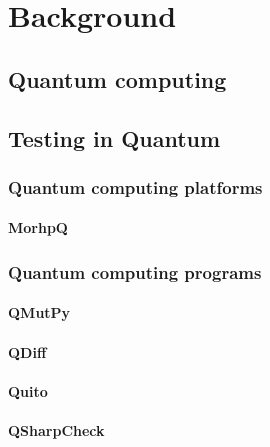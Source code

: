 \cleardoublepage

\chapter{Background}
\label{Ch2:Back}

\section{Quantum computing}
\label{Ch2.1:Quantum}

\section{Testing in Quantum}
\label{Ch2.2:TQuantum}

\subsection{Quantum computing platforms}
\label{Ch2.2.1:TPlat}

\subsubsection{MorhpQ}
\label{Ch2.2.1:MorphQ}

\subsection{Quantum computing programs}
\label{Ch2.2:TQP}

\subsubsection{QMutPy}
\label{Ch2.2.2:QMutPy}

\subsubsection{QDiff}
\label{Ch2.2.2:QDiff}

\subsubsection{Quito}
\label{Ch2.2.2:Quito}

\subsubsection{QSharpCheck}
\label{Ch2.2.2:QSharpCheck}
